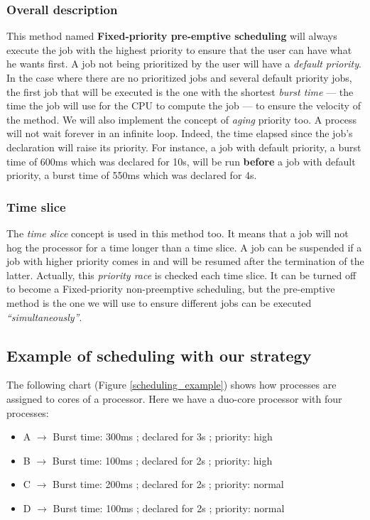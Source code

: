 \documentclass[a4paper,11pt]{article}
\begin{document}
\subsubsection{Overall description}

This method named \textbf{Fixed-priority pre-emptive scheduling} will always execute the job with the highest priority to ensure that the user can have what he wants first. A job not being prioritized by the user will have a \textit{default priority}. 
In the case where there are no prioritized jobs and several default priority jobs, the first job that will be executed is the one with the shortest \textit{burst time} --- the time the job will use for the CPU to compute the job --- to ensure the velocity of the method. 
We will also implement the concept of \textit{aging} priority too. A process will not wait forever in an infinite loop. Indeed, the time elapsed since the job's declaration will raise its priority. For instance, a job with default priority, a burst time of 600ms which was declared for 10s, will be run \textbf{before} a job with default priority, a burst time of 550ms which was declared for 4s.

\subsubsection{Time slice}

The \textit{time slice} concept is used in this method too. It means that a job will not hog the processor for a time longer than a time slice. A job can be suspended if a job with higher priority comes in and will be resumed after the termination of the latter. Actually, this \textit{priority race} is checked each time slice. It can be turned off to become a Fixed-priority non-preemptive scheduling, but the pre-emptive method is the one we will use to ensure different jobs can be executed \textit{“simultaneously”}.

\subsection{Example of scheduling with our strategy}

The following chart (Figure \ref{scheduling_example}) shows how processes are assigned to cores of a processor. Here we have a duo-core processor with four processes:

\begin{itemize}
\item A $\rightarrow$ Burst time: 300ms ; declared for 3s ; priority: high
\item B $\rightarrow$ Burst time: 100ms ; declared for 2s ; priority: high
\item C $\rightarrow$ Burst time: 200ms ; declared for 2s ; priority: normal
\item D $\rightarrow$ Burst time: 100ms ; declared for 2s ; priority: normal
\end{itemize}
\end{document}
